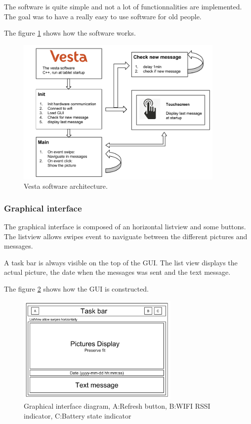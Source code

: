 The software is quite simple and not a lot of functionnalities are implemented. The goal was to have a really easy to use software for old people.

The figure \ref{fig:soft archi} shows how the software works.

\begin{figure}[!htb]
    \centering
    \includegraphics[width=0.9\textwidth,keepaspectratio]{chap/softFig/vesta_software_diagram2}
    \caption{Vesta software architecture.}
    \label{fig:soft archi}
\end{figure}

\clearpage

\subsubsection{Graphical interface}
The graphical interface is composed of an horizontal listview and some buttons. The listview allows swipes event to naviguate between the different pictures and messages.

A task bar is always visible on the top of the GUI. The list view displays the actual picture, the date when the messages was sent and the text message.

The figure \ref{fig:gui diagram} shows how the GUI is constructed.

\begin{figure}[!htb]
    \centering
    \includegraphics[width=0.7\textwidth,keepaspectratio]{chap/softFig/GUI_diagram}
    \caption{Graphical interface diagram, A:Refresh button, B:WIFI RSSI indicator, C:Battery state indicator}
    \label{fig:gui diagram}
\end{figure}

